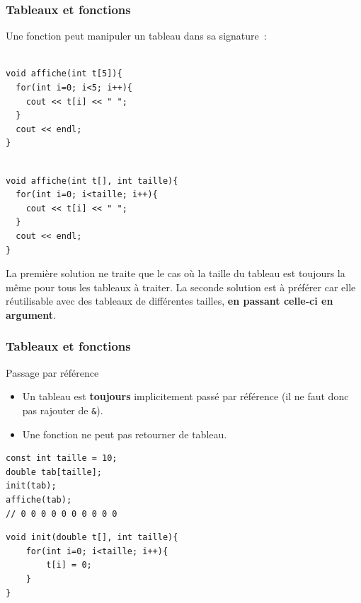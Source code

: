 \begin{frame}[fragile]
\frametitle{Tableaux et fonctions}

Une fonction peut manipuler un tableau dans sa signature~:

\begin{minipage}{0.47\linewidth}
\begin{verbatim}

void affiche(int t[5]){
  for(int i=0; i<5; i++){
    cout << t[i] << " ";
  }
  cout << endl;
}

\end{verbatim}
\end{minipage}
\hfill
\begin{minipage}{0.52\linewidth}
\begin{verbatim}

void affiche(int t[], int taille){
  for(int i=0; i<taille; i++){
    cout << t[i] << " ";
  }
  cout << endl;
}

\end{verbatim}
\end{minipage}

\vspace{0.3cm}
La première solution ne traite que le cas où la taille du tableau est toujours la même pour tous les tableaux à traiter. La seconde solution est à préférer car elle réutilisable avec des tableaux de différentes tailles, \textbf{en passant celle-ci en argument}.
\end{frame}

\begin{frame}[fragile]
\frametitle{Tableaux et fonctions}
\begin{alertblock}{Passage par référence}
\begin{itemize}
\item Un tableau est \textbf{toujours} implicitement passé par référence (il ne faut donc pas rajouter de \texttt{\&}).
\item Une fonction ne peut pas retourner de tableau.
\end{itemize}
\end{alertblock}

\begin{minipage}{0.45\linewidth}
\begin{verbatim}
const int taille = 10;
double tab[taille];
init(tab);
affiche(tab);
// 0 0 0 0 0 0 0 0 0 0
\end{verbatim}
\end{minipage}
\hfill
\begin{minipage}{0.54\linewidth}
\begin{verbatim}
void init(double t[], int taille){
    for(int i=0; i<taille; i++){
        t[i] = 0;
    }
}
\end{verbatim}
\end{minipage}
\end{frame}

